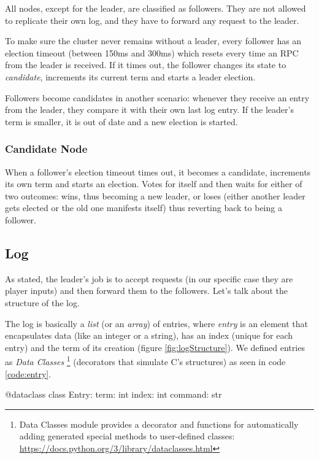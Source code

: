 All nodes, except for the leader, are classified as followers. They are not allowed to replicate their own log, and they have to forward any request to the leader.

To make sure the cluster never remains without a leader, every follower has an election timeout (between 150ms and 300ms) which resets every time an RPC from the leader is received. If it times out, the follower changes its state to \textit{candidate}, increments its current term and starts a leader election. 

Followers become candidates in another scenario: whenever they receive an entry from the leader, they compare it with their own last log entry. If the leader's term is smaller, it is out of date and a new election is started. 

\subsubsection{Candidate Node}

When a follower's election timeout times out, it becomes a candidate, increments its own term and starts an election. Votes for itself and then waits for either of two outcomes: wins, thus becoming a new leader, or loses (either another leader gets elected or the old one manifests itself) thus reverting back to being a follower.

\subsection{Log}

As stated, the leader's job is to accept requests (in our specific case they are player inputs) and then forward them to the followers. Let's talk about the structure of the log. 

The log is basically a \textit{list} (or an \textit{array}) of entries, where \textit{entry} is an element that encapsulates data (like an integer or a string), has an index (unique for each entry) and the term of its creation (figure \ref{fig:logStructure}). We defined entries as \textit{Data Classes} \footnote{Data Classes module provides a decorator and functions for automatically adding generated special methods to user-defined classes: \url{https://docs.python.org/3/library/dataclasses.html}} (decorators that simulate C's structures) as seen in code \ref{code:entry}.

\begin{python}[label={code:entry}, caption={Dataclass Entry definition}]
@dataclass
class Entry:
    term: int
    index: int
    command: str 
\end{python}

